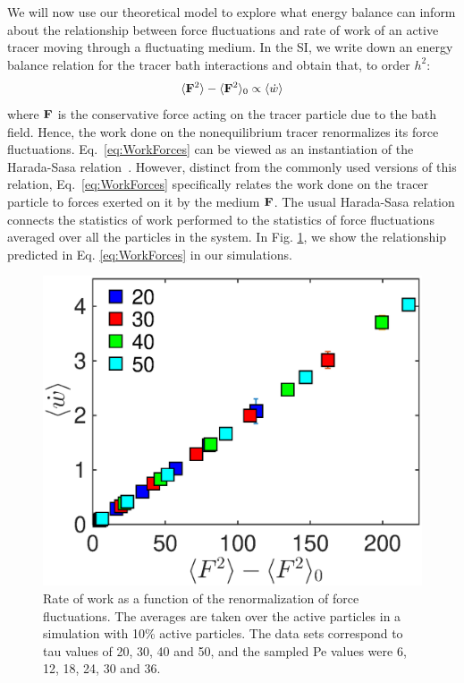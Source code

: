 \documentclass[pre,amsmath,preprintnumbers,10pt,article,notitlepage,twocolumn]{revtex4-1}
\begin{document}

We will now use our theoretical model to explore what energy balance can inform about the relationship between force fluctuations and rate of work of an active tracer moving through a fluctuating medium. In the SI, we write down an energy balance relation for the tracer bath interactions and obtain that, to order $h^2$:
\begin{align}
  \langle {\bf F}^2 \rangle - \langle {\bf F}^2 \rangle_0  \propto \langle \dot{w} \rangle 
\label{eq:WorkForces}
\end{align}
where ${\bf F}$ is the conservative force acting on the tracer particle due to the bath field. 
Hence, the work done on the nonequilibrium tracer renormalizes its force fluctuations. Eq.~\ref{eq:WorkForces} can be viewed as an instantiation of the Harada-Sasa relation~\cite{Harada2005}. However, distinct from the commonly used versions of this relation, Eq.~\ref{eq:WorkForces} specifically relates the work done on the tracer particle to forces exerted on it by the medium ${\bf F}$. The usual Harada-Sasa relation connects the statistics of work performed to the statistics of force fluctuations averaged over all the particles in the system. In Fig. \ref{fig:dw_fvar}, we show the relationship predicted in Eq. \ref{eq:WorkForces} in our simulations.
\begin{figure}[tbp]
\centering
\includegraphics[width=0.85\linewidth]{dw_fvar_10p_active_av_active.eps}
\caption{Rate of work as a function of the renormalization of force fluctuations. The averages are taken over the active particles in a simulation with 10\% active particles. The data sets correspond to tau values of 20, 30, 40 and 50, and the sampled Pe values were 6, 12, 18, 24, 30 and 36.}
\label{fig:dw_fvar}
\end{figure}
\end{document}
